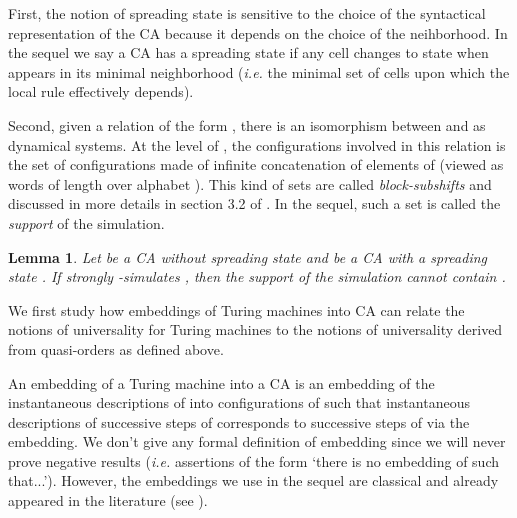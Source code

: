 \documentclass[a4paper]{elsarticle}
\def\qed{\relax\ifmmode\hskip2em \blacksquare\else\unskip\nobreak\hfill\hskip1em \fi}
\newtheorem{lm}{Lemma}[section]
\begin{document}
First, the notion of spreading state is sensitive to the choice of the
syntactical representation of the CA because it depends on the choice
of the neihborhood. In the sequel we say a CA  has a spreading
state  if any cell changes to state  when 
appears in its minimal neighborhood (\textit{i.e.} the minimal set of
cells upon which the local rule effectively depends).

Second, given a relation of the form
, there is an isomorphism between
 and  as dynamical systems. At the level of
, the configurations involved in this relation is the set  of
configurations made of infinite concatenation of elements of
 (viewed as words of length  over
alphabet ). This kind of sets are called \emph{block-subshifts}
and discussed in more details in section 3.2 of \cite{bulking1}. In
the sequel, such a set  is called the \emph{support} of the
simulation.

\begin{lm}
  \label{lm:nospread}
  Let  be a CA without spreading state and  be a CA with a
  spreading state . If  strongly -simulates
  , then the support  of the simulation cannot contain
  .
\end{lm}



We first study how embeddings of Turing machines into CA can relate
the notions of universality for Turing machines to the notions of
universality derived from quasi-orders as defined above.

An embedding of a Turing machine  into a CA  is an
embedding of the instantaneous descriptions of  into
configurations of  such that instantaneous descriptions of
successive steps of  corresponds to successive steps of 
via the embedding. We don't give any formal definition of embedding
since we will never prove negative results (\textit{i.e.} assertions of
the form `there is no embedding of  such that...'). However, the
embeddings we use in the sequel are classical and already appeared in
the literature (see \cite{Sutner03}).
\end{document}
